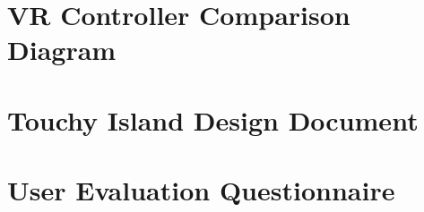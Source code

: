 \documentclass[12pt, a4paper]{report}
\begin{document}
\restoregeometry
\newpage


\begin{appendices}



\begingroup%
\makeatletter%
\cleardoublepage%
\let\newpage\relax%
\let\clearpage\relax%
\vspace*{\fill}%
\vspace*{\dimexpr-50\p@-\baselineskip}%
\chapter{VR Controller Comparison\\ Diagram}
\label{apx:vrControllerComparison}
\vspace*{\fill}%
\endgroup%
\newpage



\begingroup%
\makeatletter%
\cleardoublepage%
\let\newpage\relax%
\let\clearpage\relax%
\vspace*{\fill}%
\vspace*{\dimexpr-50\p@-\baselineskip}%
\chapter{Touchy Island Design Document}
\label{apx:touchyIslandDesignDocument}
\vspace*{\fill}%
\endgroup%


\begingroup%
\makeatletter%
\cleardoublepage%
\let\newpage\relax%
\let\clearpage\relax%
\vspace*{\fill}%
\vspace*{\dimexpr-50\p@-\baselineskip}%
\chapter{User Evaluation Questionnaire}
\label{apx:questionnaire}
\vspace*{\fill}%
\endgroup%



\end{appendices}
\end{document}

